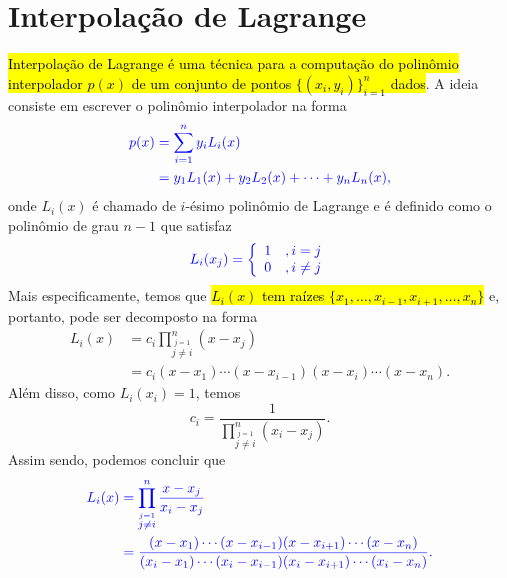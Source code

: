 \section{Interpolação de Lagrange}\label{cap_interp_sec_lagrange}

\hl{Interpolação de Lagrange{\lagrange} é uma técnica para a computação do polinômio interpolador $p(x)$ de um conjunto de pontos $\{(x_i, y_i)\}_{i=1}^n$ dados}. A ideia consiste em escrever o polinômio interpolador na forma
\begin{subequations}\hleq
  \begin{align}
    p(x) &= \sum_{i=1}^n y_iL_i(x)\\
         &= y_1L_1(x) + y_2L_2(x) + \cdots + y_nL_n(x),
  \end{align}
\end{subequations}
onde $L_i(x)$ é chamado de $i$-ésimo polinômio de Lagrange e é definido como o polinômio de grau $n-1$ que satisfaz
\begin{equation}\color{blue}L_i(x_j) = \left\{
    \begin{array}{ll}
      1 &, i=j\\
      0 &, i\neq j
    \end{array}
\right.
\end{equation}
Mais especificamente, temos que \hl{$L_i(x)$ tem raízes $\{x_1, \ldots, x_{i-1}, x_{i+1}, \ldots, x_n\}$} e, portanto, pode ser decomposto na forma
\begin{subequations}
  \begin{align}
    L_i(x) &= c_i\prod_{\overset{j=1}{j\neq i}}^n (x-x_j)\\
           &= c_i(x-x_1)\cdots(x-x_{i-1})(x-x_i)\cdots(x-x_n).
  \end{align}
\end{subequations}
Além disso, como $L_i(x_i) = 1$, temos
\begin{equation}
  c_i = \frac{1}{\displaystyle\prod_{\overset{j=1}{j\neq i}}^n (x_i-x_j)}.
\end{equation}
Assim sendo, podemos concluir que
\begin{subequations}\hleq
  \begin{align}
    L_i(x) &= \prod_{\overset{j=1}{j\neq i}}^n \frac{x-x_j}{x_i-x_j}\\
           &= \frac{(x-x_1)\cdots(x-x_{i-1})(x-x_{i+1})\cdots(x-x_n)}{(x_i-x_1)\cdots(x_i-x_{i-1})(x_i-x_{i+1})\cdots(x_i-x_n)}.
  \end{align}
\end{subequations}

